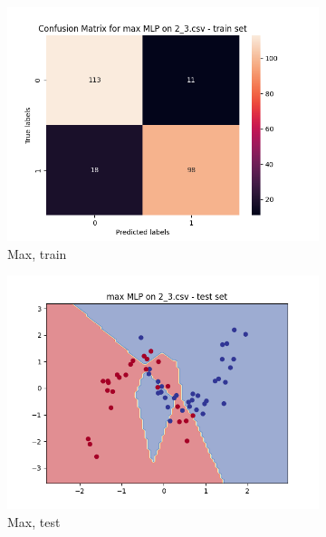 \documentclass[12pt]{article}
\newcommand*{\subfigwidth}{0.24\textwidth}
\begin{document}
\begin{figure}[H]
\begin{subfigure}[t]{\subfigwidth}
        \includegraphics[width=\linewidth]{img/exp_2/mlp/2_3/max/train_matrix.png}
        \caption{Max, train}
    \end{subfigure}
    \hfill
    \begin{subfigure}[t]{\subfigwidth}
        \includegraphics[width=\linewidth]{img/exp_2/mlp/2_3/max/test_boundary.png}
        \caption{Max, test}
    \end{subfigure}
    \hfill
    \begin{subfigure}[t]{\subfigwidth}

\end{subfigure}
\end{figure}
\end{document}
